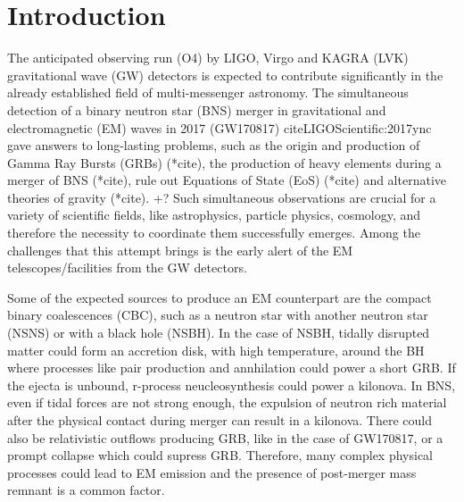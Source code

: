 \section{Introduction}

The anticipated observing run (O4) by LIGO, Virgo and KAGRA (LVK) gravitational wave (GW) detectors is expected to contribute significantly in the already established field of multi-messenger astronomy. The simultaneous detection of a binary neutron star (BNS) merger in gravitational and electromagnetic (EM) waves in 2017 (GW170817) cite{LIGOScientific:2017ync} gave answers to long-lasting problems, such as the origin and production of Gamma Ray Bursts (GRBs) (*cite), the production of heavy elements during a merger of BNS (*cite), rule out Equations of State (EoS) (*cite) and alternative theories of gravity (*cite). +? Such simultaneous observations are crucial for a variety of scientific fields, like astrophysics, particle physics, cosmology, and therefore the necessity to coordinate them successfully emerges. Among the challenges that this attempt brings is the early alert of the EM telescopes/facilities from the GW detectors. 

Some of the expected sources to produce an EM counterpart are the compact binary coalescences (CBC), such as a neutron star with another neutron star (NSNS) or with a black hole (NSBH). In the case of NSBH, tidally disrupted matter could form an accretion disk, with high temperature, around the BH where processes like pair production and annhilation could power a short GRB. If the ejecta is unbound, r-process neucleosynthesis could power a kilonova. In BNS, even if tidal forces are not strong enough, the expulsion of neutron rich material after the physical contact during merger can result in a kilonova. There could also be relativistic outflows producing GRB, like in the case of GW170817, or a prompt collapse which could supress GRB. Therefore, many complex physical processes could lead to EM emission and the presence of post-merger mass remnant is a common factor.

